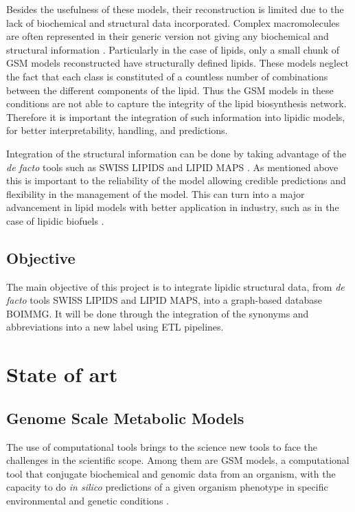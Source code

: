 \documentclass{llncs}
\begin{document}
Besides the usefulness of these models, their reconstruction is limited due to the lack of biochemical and structural data incorporated.
Complex macromolecules are often represented in their generic version not giving any biochemical and structural information \cite{Gu2019}.
Particularly in the case of lipids, only a small chunk of GSM models reconstructed have structurally defined lipids. 
These models neglect the fact that each class is constituted of a countless number of combinations between the different components of the lipid. 
Thus the GSM models in these conditions are not able to capture the integrity of the lipid biosynthesis network.
Therefore it is important the integration of such information into lipidic models, for better interpretability, handling, and predictions.

Integration of the structural information can be done by taking advantage of the  \emph{de facto} tools such as SWISS LIPIDS \cite{Aimo2015} and  LIPID MAPS \cite{Sud2007}.
As mentioned above this is important to the reliability of the model allowing credible predictions and flexibility in the management of the model.
This can turn into a major advancement in lipid models with better application in industry, such as in the case of lipidic biofuels \cite{Sawangkeaw2013}.




\subsection{Objective}

The main objective of this project is to integrate lipidic structural data, from \emph{de facto} tools SWISS LIPIDS and LIPID MAPS, into a graph-based database BOIMMG.
It will be done through the integration of the synonyms and abbreviations into a new label using ETL pipelines. 

\section{State of art}
\subsection{Genome Scale Metabolic Models}
The use of computational tools brings to the science new tools to face the challenges in the scientific scope.
Among them are GSM models, a computational tool that conjugate biochemical and genomic data from an organism, with the capacity to do \emph{in silico} predictions of a given organism phenotype in specific environmental and genetic conditions \cite{Rocha2007,Zhou2021}.
\end{document}
